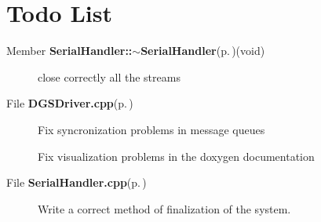 \section{Todo List}\label{todo}
\label{todo__todo000004}
 \begin{description}
\item[Member {\bf Serial\-Handler::$\sim$Serial\-Handler}{\rm (p.\,\pageref{classSerialHandler_a1})}(void) ]close correctly all the streams \end{description}


\label{todo__todo000001}
 \begin{description}
\item[File {\bf DGSDriver.cpp}{\rm (p.\,\pageref{DGSDriver_8cpp})} ]Fix syncronization problems in message queues 

Fix visualization problems in the doxygen documentation \end{description}


\label{todo__todo000003}
 \begin{description}
\item[File {\bf Serial\-Handler.cpp}{\rm (p.\,\pageref{SerialHandler_8cpp})} ]Write a correct method of finalization of the system. \end{description}
